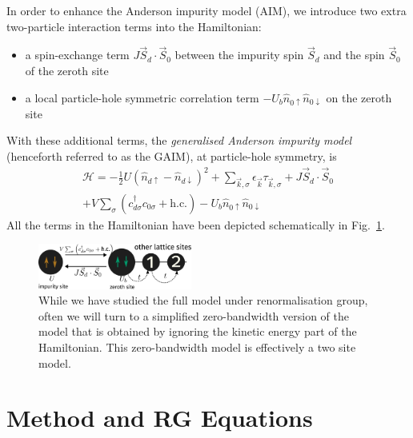 \documentclass[reprint,superscriptaddress,floatfix]{revtex4-2}
\begin{document}
In order to enhance the Anderson impurity model (AIM), we introduce two extra two-particle interaction terms into the Hamiltonian:
\begin{itemize}
	\item a spin-exchange term \(J \vec{S}_d\cdot\vec{S}_0\) between the impurity spin \(\vec S_d\) and the spin \(\vec S_0\) of the zeroth site 
	\item a local particle-hole symmetric correlation term \(-U_b \hat n_{0 \uparrow} \hat n_{0 \downarrow}\) on the zeroth site
\end{itemize}

With these additional terms, the {\it generalised Anderson impurity model} (henceforth referred to as the GAIM), at particle-hole symmetry, is
\begin{equation}\begin{aligned}
	\label{GIAM-ham}
	\mathcal{H} = -\frac{1}{2}U \left(\hat n_{d \uparrow} - \hat n_{d \downarrow}\right)^2 + \sum_{\vec k,\sigma} \epsilon_{\vec k} \tau_{\vec k,\sigma} + J \vec{S}_d\cdot\vec{S}_0 \\
	+ V\sum_\sigma \left( c^\dagger_{d\sigma}c_{0\sigma} + \text{h.c.}\right) - U_b \hat n_{0 \uparrow} \hat n_{0 \downarrow}
\end{aligned}\end{equation}
All the terms in the Hamiltonian have been depicted schematically in Fig.~\ref{zeromode-bare}.

\begin{figure}[!htb]
	\centering
	\includegraphics[width=0.45\textwidth]{zeromode_bare.pdf}
	\caption{While we have studied the full model under renormalisation group, often we will turn to a simplified zero-bandwidth version of the model that is obtained by ignoring the kinetic energy part of the Hamiltonian. This zero-bandwidth model is effectively a two site model.}
	\label{zeromode-bare}
\end{figure}

\section{Method and RG Equations}
\label{method}
\end{document}
